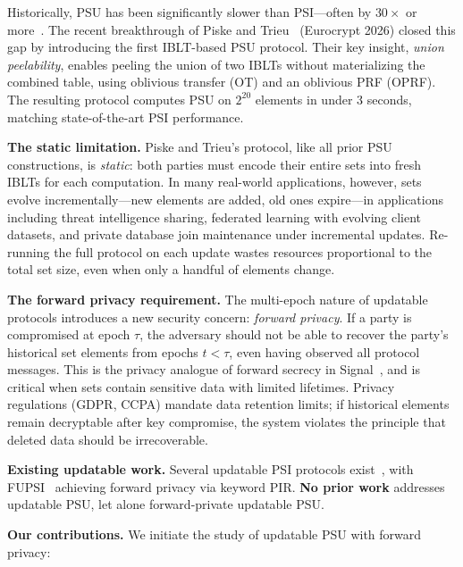 Historically, PSU has been significantly slower than PSI---often by $30\times$
or more~\cite{PT26,KRT19}. The recent breakthrough of Piske and
Trieu~\cite{PT26} (Eurocrypt 2026) closed this gap by introducing the first
IBLT-based PSU protocol. Their key insight, \emph{union peelability}, enables
peeling the union of two IBLTs without materializing the combined table, using
oblivious transfer (OT) and an oblivious PRF (OPRF). The resulting protocol
computes PSU on $2^{20}$ elements in under 3 seconds, matching state-of-the-art
PSI performance.

\textbf{The static limitation.} Piske and Trieu's protocol, like all prior PSU
constructions, is \emph{static}: both parties must encode their entire sets into
fresh IBLTs for each computation. In many real-world applications, however,
sets evolve incrementally---new elements are added, old ones expire---in applications
including threat intelligence sharing, federated learning with evolving client
datasets, and private database join maintenance under incremental updates.
Re-running the full protocol on each update wastes resources proportional
to the total set size, even when only a handful of elements change.

\textbf{The forward privacy requirement.} The multi-epoch nature of updatable
protocols introduces a new security concern: \emph{forward privacy}. If a party
is compromised at epoch $\tau$, the adversary should not be able to recover the
party's historical set elements from epochs $t < \tau$, even having observed all
protocol messages. This is the privacy analogue of forward secrecy in
Signal~\cite{Signal}, and is critical when sets contain sensitive data with
limited lifetimes. Privacy regulations (GDPR, CCPA) mandate data retention
limits; if historical elements remain decryptable after key compromise, the
system violates the principle that deleted data should be irrecoverable.

\textbf{Existing updatable work.} Several updatable PSI protocols
exist~\cite{BMX22,BMS+24,LMR+26,ABF+25,LTS+26}, with FUPSI~\cite{WZC+24}
achieving forward privacy via keyword PIR. \textbf{No prior work} addresses updatable PSU,
let alone forward-private updatable PSU.

\textbf{Our contributions.} We initiate the study of updatable PSU with forward
privacy:

